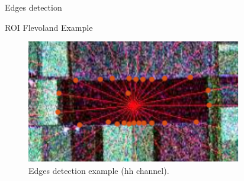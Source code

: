 \documentclass[10pt]{beamer}
\begin{document}
\begin{frame}[fragile]{Edges detection}
\begin{alertblock}{ROI Flevoland Example} 
\begin{figure}[hbt]
\centering
	\includegraphics[width=.7\linewidth]{flevoland_radial_25_point_hh_crop}
	\caption{Edges detection example ($\text{hh}$ channel).}
\label{fig1}
\end{figure}
\end{alertblock}
\end{frame}

\end{document}
